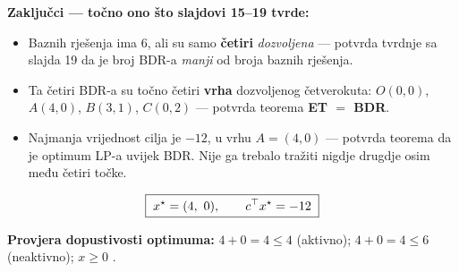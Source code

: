 \textbf{Zaključci --- točno ono što slajdovi 15--19 tvrde:}

\begin{itemize}
  \item Baznih rješenja ima $6$, ali su samo \textbf{četiri} \emph{dozvoljena}
        --- potvrda tvrdnje sa slajda 19 da je broj BDR-a \emph{manji} od broja
        baznih rješenja.
  \item Ta četiri BDR-a su točno četiri \textbf{vrha} dozvoljenog
        četverokuta: $O(0,0)$, $A(4,0)$, $B(3,1)$, $C(0,2)$ --- potvrda teorema
        \textbf{ET $=$ BDR}.
  \item Najmanja vrijednost cilja je $-12$, u vrhu $A = (4,0)$ --- potvrda
        teorema da je optimum LP-a uvijek BDR. Nije ga trebalo tražiti nigdje
        drugdje osim među četiri točke.
\end{itemize}

\[
\boxed{\; x^\star = (4,\ 0), \qquad c^{\top} x^\star = -12 \;}
\]

\textbf{Provjera dopustivosti optimuma:} $4 + 0 = 4 \le 4$ \checkmark
(aktivno); $4 + 0 = 4 \le 6$ \checkmark (neaktivno); $x \ge 0$ \checkmark.

